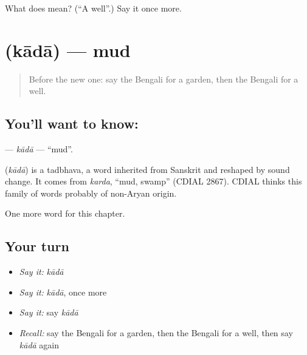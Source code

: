 \begin{tcolorbox}[breakable,colback=teal!4,colframe=teal!35!black,title={Before you move on}]
What does  mean? (\textquotedblleft{}A well\textquotedblright{}.) Say it once more.
\end{tcolorbox}
\section[\texorpdfstring{\bn{কাদা} (kādā)}{কাদা (kādā)}]{ (kādā) — mud}

\label{lesson:BN-C113-kada}



\begin{quote}
Before the new one: say the Bengali for a garden, then the Bengali for a well.
\end{quote}

\subsection*{You'll want to know: }
\textbf{} — \emph{kādā} — \textquotedblleft{}mud\textquotedblright{}.

\begin{cousinweb}
\textbf{} (\emph{kādā}) is a tadbhava, a word inherited from Sanskrit and reshaped by sound change. It comes from \emph{karda}, \textquotedblleft{}mud, swamp\textquotedblright{} (CDIAL 2867). CDIAL thinks this family of words probably of non-Aryan origin.
\end{cousinweb}

\begin{grammarlens}[title={What you've built}]
One more word for this chapter.
\end{grammarlens}

\subsection*{Your turn}
\begin{itemize}
\raggedright
  \item \emph{Say it:} \emph{kādā}
  \item \emph{Say it:} \emph{kādā}, once more
  \item \emph{Say it:} say \emph{kādā}
  \item \emph{Recall:} say the Bengali for a garden, then the Bengali for a well, then say \emph{kādā} again
\end{itemize}


